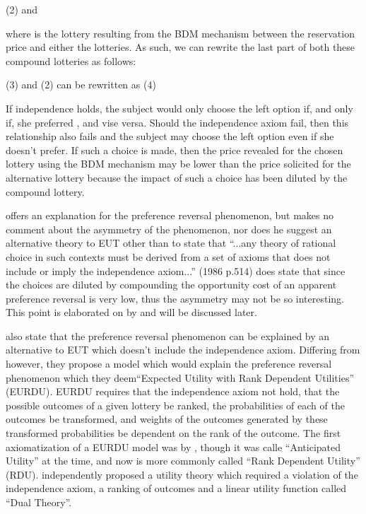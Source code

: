 \documentclass[../main.tex]{subfiles}
\begin{document}
(2)	  and   

where  is the lottery resulting from the BDM mechanism between the reservation price  and either the  lotteries.
As such, we can rewrite the last part of both these compound lotteries as follows:

(3)	
and (2) can be rewritten as
(4)	

If independence holds, the subject would only choose the left option if, and only if, she preferred , and vise versa.
Should the independence axiom fail, then this relationship also fails and the subject may choose the left option even if she doesn't prefer.
If such  a choice is made, then the price revealed for the chosen lottery using the BDM mechanism may be lower than the price solicited for the alternative lottery because the impact of such a choice has been diluted by the compound lottery. 

\textcite{Holt1986} offers an explanation for the preference reversal phenomenon, but makes no comment about the asymmetry of the phenomenon, nor does he suggest an alternative theory to EUT other than to state that \enquote{...any theory of rational choice in such contexts must be derived from a set of axioms that does not include or imply the independence axiom...} (1986 p.514) \textcite{Holt1986} does state that since the choices are diluted by compounding the opportunity cost of an apparent preference reversal is very low, thus the asymmetry may not be so interesting.
This point is elaborated on by \textcite{Harrison1989, Harrison1992} and will be discussed later. 

\textcite{Karni1987} also state that the preference reversal phenomenon can be explained by an alternative to EUT which doesn't include the independence axiom.
Differing from \textcite{Holt1986} however, they propose a model which would explain the preference reversal phenomenon which they deem\enquote{Expected Utility with Rank Dependent Utilities} (EURDU).
EURDU requires that  the independence axiom not hold, that the possible outcomes of a given lottery be ranked, the probabilities of each of the outcomes be transformed, and weights of the outcomes generated by these transformed probabilities be dependent on the rank of the outcome.
The first axiomatization of a EURDU model was by \textcite{Quiggin1982}, though it was calle \enquote{Anticipated Utility} at the time, and now is more commonly called \enquote{Rank Dependent Utility} (RDU).
\textcite{Yaari1987} independently proposed a utility theory which required a violation of the independence axiom, a ranking of outcomes and a linear utility function called \enquote{Dual Theory}.
\end{document}
